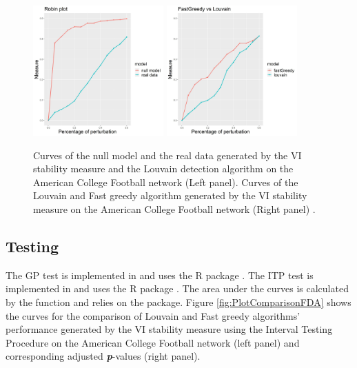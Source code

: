 \begin{figure}[h]
\centering
\includegraphics[width=.4\textwidth, height=5cm]{PlotRobin.png}
\includegraphics[width=.4\textwidth, height=5cm]{PlotCompare.png}
\caption{Curves of the null model and the real data generated by the VI stability measure and the Louvain detection algorithm on the American College Football network (Left panel). Curves of the Louvain and Fast greedy algorithm generated by the VI stability measure on the American College Football network (Right panel) \citep{GirvanNewman:2002}.}
\label{fig:PlotComparison}
\end{figure}

\subsection{Testing}
The GP test is implemented in  and uses the R package  \citep{KalaitzisLawrence2011}. The ITP test is implemented in  and uses the R package  \citep{PiniVantini:2015}. The area under the curves is calculated by the function  and relies on the  package. Figure \ref{fig:PlotComparisonFDA} shows the curves for the comparison of Louvain and Fast greedy algorithms' performance generated by the VI stability measure using the Interval Testing Procedure on the American College Football network (left panel) \citep{GirvanNewman:2002} and corresponding adjusted \textbf{\emph{p}}-values (right panel).

